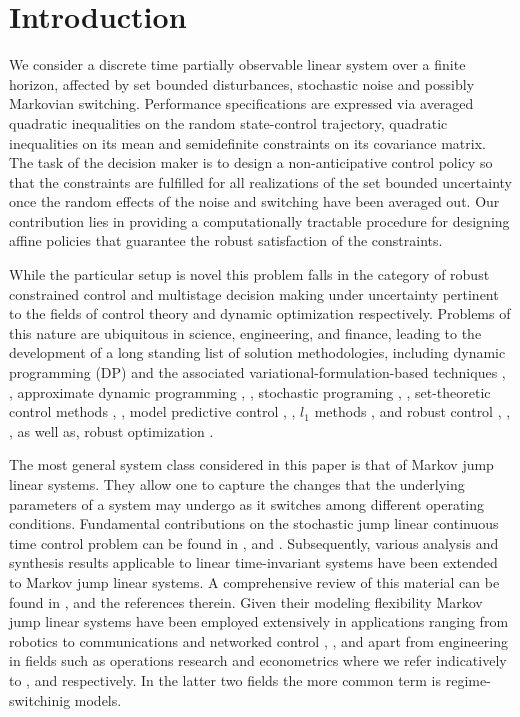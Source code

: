 \documentclass[letterpaper,11pt]{article}
\begin{document}
\vspace{0.1cm}

\setcounter{equation}{0}

\section{Introduction}

We  consider a discrete time partially observable linear system over a finite horizon, 
affected by set bounded disturbances, stochastic noise and possibly Markovian switching. 
Performance specifications are expressed via averaged quadratic inequalities on the random state-control trajectory, 
quadratic inequalities on its mean and semidefinite constraints on its covariance matrix.
The task of the decision maker is to design a non-anticipative control policy so that the constraints are fulfilled 
for all realizations of the  set bounded uncertainty once the random effects of the noise and switching have been averaged out.  Our contribution lies in providing a computationally tractable procedure for designing affine policies that guarantee the robust satisfaction of the constraints.

While the particular setup is novel this problem falls in the category of  robust constrained control and multistage decision making under uncertainty pertinent to the fields of control theory and dynamic optimization respectively. 
Problems of this nature are ubiquitous in science, engineering, and 
finance, leading to the development of a long standing list of solution methodologies, including 
dynamic programming (DP) and the associated variational-formulation-based techniques
\cite{fleming}, \cite{bertsekas1},
approximate dynamic programming \cite{sutton}, \cite{bertsekas2},
stochastic programing \cite{birge}, \cite{shapiro},
set-theoretic control methods \cite{blanchini}, \cite{kurzhanski}, model predictive control \cite{rawlings}, \cite{maj},
$l_1$ methods \cite{dahleh}, \cite{elia} and robust control 
\cite{zhou}, \cite{basar}, \cite{dullerud}, as well as, 
robust optimization \cite{bental1}.


The most general system class considered in this paper is that of Markov jump linear systems. They allow
one to capture the changes that the underlying parameters of a system may undergo as it switches among different 
operating conditions. 
Fundamental contributions on the stochastic jump linear continuous time control problem 
can be found in \cite{krasovskii}, \cite{sworder} and \cite{wohnham}.
Subsequently, various analysis and synthesis results applicable
to linear time-invariant systems have been extended to
 Markov jump linear systems. A comprehensive review of
this material can be found in \cite{costa}, \cite{morozan} and the references therein.
Given their modeling flexibility Markov jump linear systems have been employed extensively in applications ranging from robotics to communications and networked control \cite{seiler}, \cite{hespanha}, 
and apart from engineering in fields such as operations research and econometrics where we refer indicatively to \cite{kwon}, \cite{tu} and \cite{hamilton} respectively. 
In the latter two fields the more common term is regime-switchinig models. 
\end{document}
